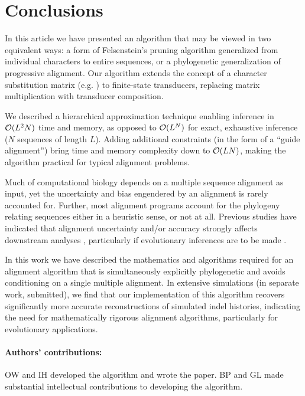 \documentclass{article}
\begin{document}
\section{Conclusions}

In this article we have presented an algorithm that may be viewed in two equivalent ways: a form of Felsenstein's pruning algorithm generalized from individual characters to entire sequences, 
or a phylogenetic generalization of progressive alignment.   
Our algorithm  extends the concept of a character substitution matrix (e.g. \cite{JukesCantor69, HasegawaEtAl85}) to finite-state transducers, replacing matrix multiplication with transducer composition.

We described a hierarchical  approximation technique enabling inference in ${\cal O}(L^2N)$ time and memory, as opposed to ${\cal O}(L^N)$ for exact, exhaustive inference ($N$ sequences of length $L$). 
Adding additional constraints (in the form of a ``guide alignment'')  bring time and memory complexity down to ${\cal O}(LN)$, making the algorithm practical for typical alignment problems.  

Much of computational biology depends on a multiple sequence alignment as input, yet the uncertainty and bias engendered by an alignment is rarely accounted for.  
Further, most alignment programs account for the phylogeny relating sequences either in a heuristic sense, or not at all.  
Previous studies have indicated that alignment uncertainty and/or accuracy  strongly affects downstream analyses \cite{WongEtAl2008}, particularly if evolutionary inferences are to be made \cite{LoytynojaGoldman2008}.

In this work we have described  the mathematics and algorithms required for an alignment algorithm that is simultaneously explicitly phylogenetic and avoids conditioning on a single multiple alignment.
  In extensive simulations (in separate work, submitted), we find that our implementation of this algorithm recovers significantly more accurate reconstructions of simulated indel histories, 
indicating the need for mathematically rigorous alignment algorithms, particularly for evolutionary applications. 


\paragraph{Authors' contributions:} OW and IH developed the algorithm and wrote the paper.  BP and GL made substantial intellectual contributions to developing the algorithm.  
\end{document}
